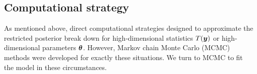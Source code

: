 \documentclass[11pt]{article}
\def\bth{\mbox{\boldmath $\theta$}}
\newcommand{\by}{\mbox{\boldmath $y$}}
\begin{document}



\subsection{Computational strategy}
\label{highDim}

As mentioned above, direct computational strategies designed to approximate the restricted posterior break down for high-dimensional statistics $T(\by)$ or high-dimensional parameters $\bth$. %
However, Markov chain Monte Carlo (MCMC) methods were developed for exactly these situations.  We turn to MCMC to 
fit the model in these circumstances.  
\end{document}
